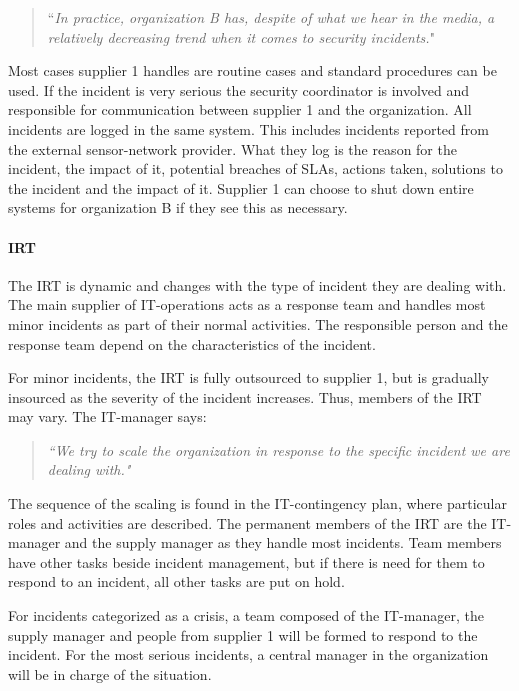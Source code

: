 \begin{quote}
``\textit{In practice, organization B has, despite of what we hear in the media, a relatively decreasing trend when it comes to security incidents.}"
\end{quote}

Most cases supplier 1 handles are routine cases and standard procedures can be used. If the incident is very serious the security coordinator is involved and responsible for communication between supplier 1 and the organization. All incidents are logged in the same system. This includes incidents reported from the external sensor-network provider. What they log is the reason for the incident, the impact of it, potential breaches of \acp{SLA}, actions taken, solutions to the incident and the impact of it. Supplier 1 can choose to shut down entire systems for organization B if they see this as necessary.

\paragraph{\acl{IRT}}
The \ac{IRT} is dynamic and changes with the type of incident they are dealing with. The main supplier of IT-operations acts as a response team and handles most minor incidents as part of their normal activities. The responsible person and the response team depend on the characteristics of the incident.   

For minor incidents, the \ac{IRT} is fully outsourced to supplier 1, but is gradually insourced as the severity of the incident increases. Thus, members of the \ac{IRT} may vary. The IT-manager says:
\begin{quote}
\textit{``We try to scale the organization in response to the specific incident we are dealing with."}
\end{quote}

The sequence of the scaling is found in the IT-contingency plan, where particular roles and activities are described. The permanent members of the \ac{IRT} are the IT-manager and the supply manager as they handle most incidents. Team members have other tasks beside incident management, but if there is need for them to respond to an incident, all other tasks are put on hold.

For incidents categorized as a crisis, a team composed of the IT-manager, the supply manager and people from supplier 1 will be formed to respond to the incident. For the most serious incidents, a central manager in the organization will be in charge of the situation.

